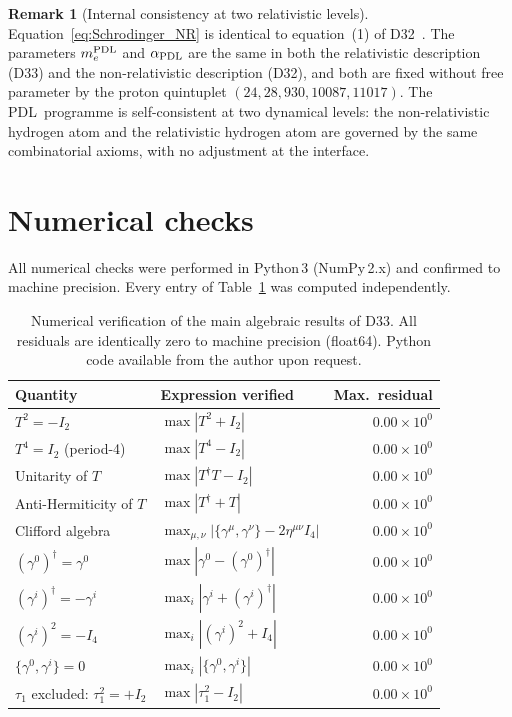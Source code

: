 \documentclass[11pt,a4paper]{article}
\theoremstyle{definition}
\newtheorem{remark}[theorem]{Remark}
\newcommand{\PDL}{\textnormal{PDL}}
\newcommand{\aPDL}{\alpha_{\PDL}}
\newcommand{\mePDL}{m_e^{\PDL}}
\begin{document}
\begin{remark}[Internal consistency at two relativistic levels]
Equation~\eqref{eq:Schrodinger_NR} is identical to equation~(1) of D32~\cite{PDL_D32_2026}. The parameters $\mePDL$ and $\aPDL$ are the same in both the relativistic description (D33) and the non-relativistic description (D32), and both are fixed without free parameter by the proton quintuplet $(24, 28, 930, 10087, 11017)$. The \PDL\ programme is self-consistent at two dynamical levels: the non-relativistic hydrogen atom and the relativistic hydrogen atom are governed by the same combinatorial axioms, with no adjustment at the interface.
\end{remark}

\section{Numerical checks}
\label{sec:numerics}

All numerical checks were performed in Python\,3 (NumPy\,2.x) and confirmed to machine precision. Every entry of Table~\ref{tab:numerics} was computed independently.

\begin{table}[ht]
\centering
\caption{Numerical verification of the main algebraic results of D33. All residuals are identically zero to machine precision (float64). Python code available from the author upon request.}
\label{tab:numerics}
\begin{tabular}{llr}
\toprule
Quantity & Expression verified & Max.\ residual \\
\midrule
$T^2 = -I_2$ & $\max|T^2 + I_2|$ & $0.00\times10^0$ \\
$T^4 = I_2$ (period-4) & $\max|T^4 - I_2|$ & $0.00\times10^0$ \\
Unitarity of $T$ & $\max|T^\dagger T - I_2|$ & $0.00\times10^0$ \\
Anti-Hermiticity of $T$ & $\max|T^\dagger + T|$ & $0.00\times10^0$ \\
Clifford algebra & $\max_{\mu,\nu}|\{\gamma^\mu,\gamma^\nu\} - 2\eta^{\mu\nu}I_4|$ & $0.00\times10^0$ \\
$(\gamma^0)^\dagger = \gamma^0$ & $\max|\gamma^0 - (\gamma^0)^\dagger|$ & $0.00\times10^0$ \\
$(\gamma^i)^\dagger = -\gamma^i$ & $\max_i|\gamma^i + (\gamma^i)^\dagger|$ & $0.00\times10^0$ \\
$(\gamma^i)^2 = -I_4$ & $\max_i|(\gamma^i)^2 + I_4|$ & $0.00\times10^0$ \\
$\{\gamma^0,\gamma^i\} = 0$ & $\max_i|\{\gamma^0,\gamma^i\}|$ & $0.00\times10^0$ \\
$\tau_1$ excluded: $\tau_1^2 = +I_2$ & $\max|\tau_1^2 - I_2|$ & $0.00\times10^0$ \\
\bottomrule
\end{tabular}
\end{table}
\end{document}
